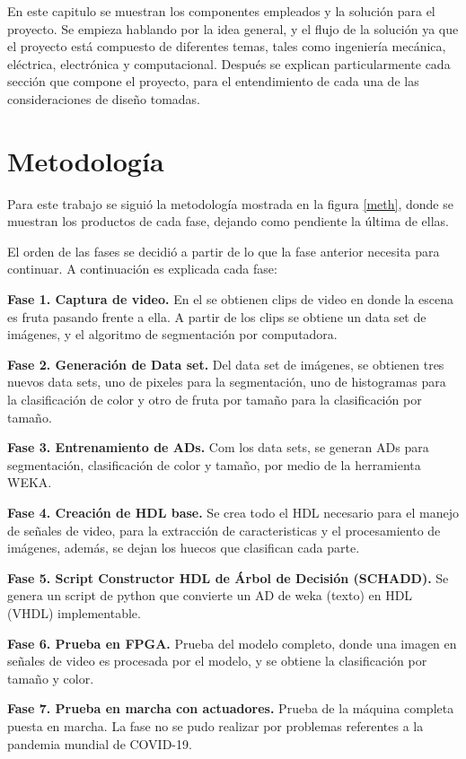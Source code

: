 \documentclass[twoside,spanish,ESP,MSc]{plantillaLabUPV}
\theoremstyle{definition}
\begin{document}
En este capitulo se muestran los componentes empleados y la solución para el proyecto. Se empieza hablando por la idea general, y el flujo de la solución ya que el proyecto está compuesto de diferentes temas, tales como ingeniería mecánica, eléctrica, electrónica y computacional. Después se explican particularmente cada sección que compone el proyecto, para el entendimiento de cada una de las consideraciones de diseño tomadas.

\section{Metodología}

Para este trabajo se siguió la metodología mostrada en la figura \ref{meth}, donde se muestran los productos de cada fase, dejando como pendiente la última de ellas.

El orden de las fases se decidió a partir de lo que la fase anterior necesita para continuar. A continuación  es explicada cada fase:

\textbf{Fase 1. Captura de video.} En el se obtienen clips de video en donde la escena es fruta pasando frente a ella. A partir de los clips se obtiene un data set de imágenes, y el algoritmo de segmentación por computadora.

\textbf{Fase 2. Generación de Data set.} Del data set de imágenes, se obtienen tres nuevos data sets, uno de pixeles para la segmentación, uno de histogramas para la clasificación de color y otro de fruta por tamaño para la clasificación por tamaño.

\textbf{Fase 3. Entrenamiento de ADs.} Com los data sets, se generan ADs para segmentación, clasificación de color y tamaño, por medio de la herramienta WEKA. 

\textbf{Fase 4. Creación de HDL base.} Se crea todo el HDL necesario para el manejo de señales de video, para la extracción de caracteristicas y el procesamiento de imágenes, además, se dejan los huecos que clasifican cada parte.

\textbf{Fase 5. Script Constructor HDL de Árbol de Decisión (SCHADD).} Se genera un script de python que convierte un AD de weka (texto) en HDL (VHDL) implementable.

\textbf{Fase 6. Prueba en FPGA.} Prueba del modelo completo, donde una imagen en señales de video es procesada por el modelo, y se obtiene la clasificación por tamaño y color.

\textbf{Fase 7. Prueba en marcha con actuadores.} Prueba de la máquina completa puesta en marcha. La fase no se pudo realizar por problemas referentes a la pandemia mundial de COVID-19.
\end{document}
